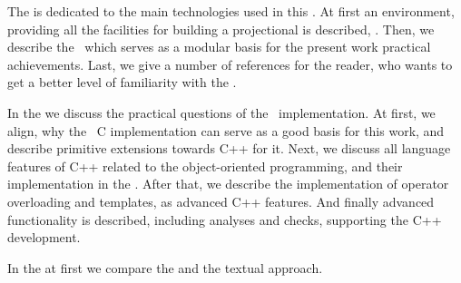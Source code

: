 The  is dedicated to the main technologies used in this \MT. At first an environment, providing
all the facilities for building a projectional  is described, \jbmps. Then, we describe the \mbdp\
which serves as a modular basis for the present work practical achievements. Last, we give a number of 
references for the reader, who wants to get a better level of familiarity with the \cpppl.

In the  we discuss the practical questions of the \pcpp\ implementation. At first, we align,
why the \mbdr\ C implementation can serve as a good basis for this work, and describe primitive 
extensions towards C++ for it. Next, we discuss all language features of C++ related to the 
object-oriented programming, and their implementation in the \pcpp. After that, we describe the implementation
of operator overloading and templates, as advanced C++ features. And finally advanced \rg{ide} functionality
is described, including analyses and checks, supporting the C++ development.

In the  at first we compare the  and the textual approach.


